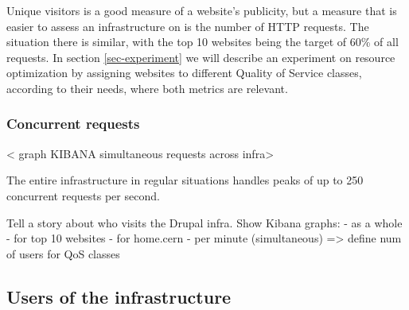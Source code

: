 Unique visitors is a good measure of a website's publicity, but a measure that is easier to assess an infrastructure on is the number of HTTP requests.
The situation there is similar, with the top 10 websites being the target of 60\% of all requests.
In section \ref{sec-experiment} we will describe an experiment on resource optimization by assigning websites to different Quality of Service classes,
according to their needs, where both metrics are relevant.


\subsubsection{Concurrent requests}

< graph KIBANA simultaneous requests across infra> %

The entire infrastructure in regular situations handles peaks of up to 250 concurrent requests per second.


Tell a story about who visits the Drupal infra.
Show Kibana graphs:
- as a whole
- for top 10 websites
- for home.cern
- per minute (simultaneous)
=> define num of users for QoS classes

\subsection{Users of the infrastructure}

